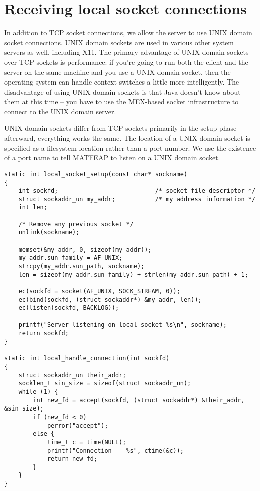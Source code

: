 \section{Receiving local socket connections}

In addition to TCP socket connections, we allow the server to use
UNIX domain socket connections.  UNIX domain sockets are used in various
other system servers as well, including X11.  The primary advantage of
UNIX-domain sockets over TCP sockets is performance: if you're
going to run both the client and the server on the same machine and
you use a UNIX-domain socket, then the operating system can handle
context switches a little more intelligently.  The disadvantage of
using UNIX domain sockets is that Java doesn't know about them at
this time -- you have to use the MEX-based socket infrastructure to
connect to the UNIX domain server.

UNIX domain sockets differ from TCP sockets primarily in the setup
phase -- afterward, everything works the same.  The location of a
UNIX domain socket is specified as a filesystem location rather than
a port number.  We use the existence of a port name to tell MATFEAP
to listen on a UNIX domain socket.

\begin{verbatim}
static int local_socket_setup(const char* sockname)
{
    int sockfd;                           /* socket file descriptor */
    struct sockaddr_un my_addr;           /* my address information */
    int len;

    /* Remove any previous socket */
    unlink(sockname);

    memset(&my_addr, 0, sizeof(my_addr));
    my_addr.sun_family = AF_UNIX;
    strcpy(my_addr.sun_path, sockname);
    len = sizeof(my_addr.sun_family) + strlen(my_addr.sun_path) + 1;

    ec(sockfd = socket(AF_UNIX, SOCK_STREAM, 0));
    ec(bind(sockfd, (struct sockaddr*) &my_addr, len));
    ec(listen(sockfd, BACKLOG));

    printf("Server listening on local socket %s\n", sockname);
    return sockfd;
}

static int local_handle_connection(int sockfd)
{
    struct sockaddr_un their_addr;
    socklen_t sin_size = sizeof(struct sockaddr_un);
    while (1) {
        int new_fd = accept(sockfd, (struct sockaddr*) &their_addr, &sin_size);
        if (new_fd < 0)
            perror("accept");
        else {
            time_t c = time(NULL);
            printf("Connection -- %s", ctime(&c));
            return new_fd;
        }
    }
}

\end{verbatim}
